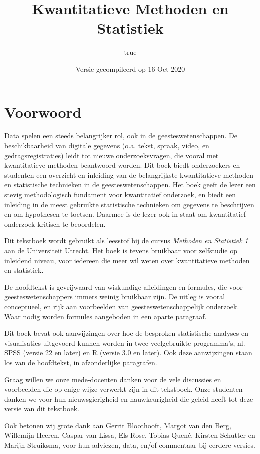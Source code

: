 \documentclass[
]{book}
\title{Kwantitatieve Methoden en Statistiek}
\author{true}
\date{Versie gecompileerd op 16 Oct 2020}
\begin{document}
\maketitle

{
\setcounter{tocdepth}{1}
\tableofcontents
}
\hypertarget{voorwoord}{%
\chapter*{Voorwoord}\label{voorwoord}}

Data spelen een steeds belangrijker rol, ook in de geesteswetenschappen.
De beschikbaarheid van digitale gegevens (o.a. tekst, spraak, video, en gedragsregistraties) leidt tot nieuwe onderzoeksvragen, die vooral met kwantitatieve methoden beantwoord worden.
Dit boek biedt onderzoekers en studenten een overzicht en inleiding van de belangrijkste kwantitatieve methoden en statistische technieken in de geesteswetenschappen. Het boek geeft de lezer een stevig methodologisch fundament voor kwantitatief onderzoek, en biedt een inleiding in de meest gebruikte statistische technieken om gegevens te beschrijven en om hypothesen te toetsen. Daarmee is de lezer ook in staat om kwantitatief onderzoek kritisch te beoordelen.

Dit tekstboek wordt gebruikt als leesstof bij de cursus \emph{Methoden en Statistiek 1} aan de Universiteit Utrecht. Het boek is tevens bruikbaar voor zelfstudie op inleidend niveau, voor iedereen die meer wil weten over kwantitatieve methoden en statistiek.

De hoofdtekst is gevrijwaard van wiskundige afleidingen en formules, die voor geesteswetenschappers immers weinig bruikbaar zijn. De uitleg is vooral conceptueel, en rijk aan voorbeelden van geesteswetenschappelijk onderzoek. Waar nodig worden formules aangeboden in een aparte paragraaf.

Dit boek bevat ook aanwijzingen over hoe de besproken statistische analyses en visualisaties uitgevoerd kunnen worden in twee veelgebruikte programma's, nl. SPSS (versie 22 en later) en R (versie 3.0 en later). Ook deze aanwijzingen staan los van de hoofdtekst, in afzonderlijke paragrafen.

Graag willen we onze mede-docenten danken voor de vele discussies en voorbeelden die op enige wijze verwerkt zijn in dit tekstboek. Onze studenten danken we voor hun nieuwsgierigheid en nauwkeurigheid die geleid heeft tot deze versie van dit tekstboek.

Ook betonen wij grote dank aan
Gerrit Bloothooft,
Margot van den Berg,
Willemijn Heeren,
Caspar van Lissa,
Els Rose,
Tobias Quené,
Kirsten Schutter
en Marijn Struiksma,
voor hun adviezen, data, en/of commentaar bij eerdere versies.
\end{document}
